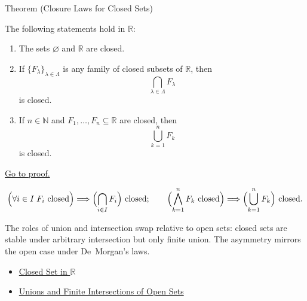 \begin{theorembox}{Theorem (Closure Laws for Closed Sets)}
\begin{theorem}
\label{thm:closed-set-closure-operations}
The following statements hold in $\mathbb{R}$:
\begin{enumerate}[label=(\roman*)]
  \item The sets $\varnothing$ and $\mathbb{R}$ are closed.
  \item If $\{F_\lambda\}_{\lambda\in\Lambda}$ is any family of closed subsets
  of $\mathbb{R}$, then
  \[
    \bigcap_{\lambda\in\Lambda}F_\lambda
  \]
  is closed.
  \item If $n\in\mathbb{N}$ and $F_1,\ldots,F_n\subseteq\mathbb{R}$ are
  closed, then
  \[
    \bigcup_{k=1}^{n}F_k
  \]
  is closed.
\end{enumerate}
\hyperref[prf:closed-set-closure-operations]{Go to proof.}
\end{theorem}
\end{theorembox}
\begin{remark*}
\[
\Bigl(\forall i\in I\;F_i\text{ closed}\Bigr)\Longrightarrow \Bigl(\bigcap_{i\in I} F_{i}\Bigr) \text{ closed};\qquad
\Bigl(\bigwedge_{k=1}^{n} F_k\text{ closed}\Bigr)\Longrightarrow \Bigl(\bigcup_{k=1}^{n} F_{k}\Bigr) \text{ closed}.
\]
\end{remark*}
\begin{remark*}[Interpretation]
The roles of union and intersection swap relative to open sets: closed sets are stable under arbitrary intersection but only finite union. The asymmetry mirrors the open case under De~Morgan's laws.
\end{remark*}
\begin{dependencies}
\begin{itemize}
  \item \hyperref[def:closed-set]{Closed Set in $\mathbb{R}$}
  \item \hyperref[thm:open-set-closure-operations]{Unions and Finite Intersections of Open Sets}
\end{itemize}
\end{dependencies}
